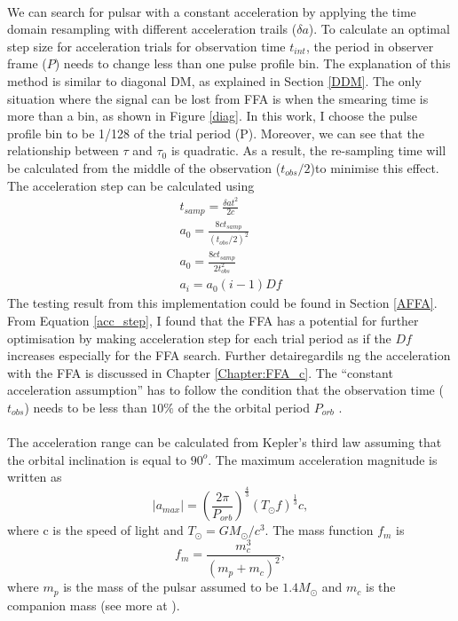 \documentclass[thesis_msc.tex]{subfiles}
\begin{document}
\paragraph{} We can search for pulsar with a constant acceleration by applying the time domain resampling with different acceleration trails ($\delta a$). To calculate an optimal step size for acceleration trials for observation time $t_{int}$, the period in observer frame ($P$) needs to change less than one pulse profile bin. The explanation of this method is similar to diagonal DM, as explained in Section \ref{DDM}. The only situation where the signal can be lost from FFA is when the smearing time is more than a bin, as shown in Figure \ref{diag}. In this work, I choose the pulse profile bin to be 1/128 of the trial period (P). Moreover, we can see that the relationship between $\tau$ and $\tau_0$ is quadratic. As a result, the re-sampling time will be calculated from the middle of the observation ($t_{obs}/2$)to minimise this effect. The acceleration step can be calculated using
\begin{eqnarray}
t_{samp}=\frac{\delta at^2}{2c}\\
a_0 = \frac{8c t_{samp}}{(t_{obs}/2)^2}\\
a_0 = \frac{8c t_{samp}}{2 t_{obs}^2}\\
a_i=a_0(i-1)Df \label{acc_step}
\end{eqnarray}
The testing result from this implementation could be found in Section \ref{AFFA}. From Equation \ref{acc_step}, I found that the FFA has a potential for further optimisation by making acceleration step for each trial period as if the $Df$ increases especially for the FFA search. Further detairegardils ng the acceleration with the FFA is discussed in Chapter \ref{Chapter:FFA_c}. The ``constant acceleration assumption'' has to follow the condition that the observation time ($t_{obs}$) needs to be less than $10\%$ of the the orbital period $P_{orb}$ \citep{ransom2002fourier}.

\paragraph{} The acceleration range can be calculated from Kepler's third law assuming that the orbital inclination is equal to $90^o$. The maximum acceleration magnitude is written as
\begin{equation}
|a_{max}|=(\frac{2\pi}{P_{orb}})^{\frac{4}{3}}(T_\odot f)^{\frac{1}{3}}c, 
\end{equation}
where c is the speed of light and $T_\odot=GM_{\odot}/c^3$. The mass function $f_m$ is 
\begin{equation}
f_m=\frac{m_c^3}{(m_p+m_c)^2},
\end{equation}
where $m_p$ is the mass of the pulsar assumed to be $1.4M_\odot$ and $m_c$ is the companion mass (see more at \cite{ng2015high}). 
\end{document}
